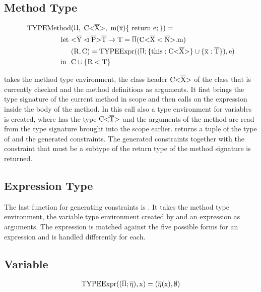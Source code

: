 \subsection{Method Type}

\begin{align*}
    \text{TYPEMethod}&(\sprod{0.7}, \ \text{C<} \ot{X} \text{>}, \ \text{m} ( \ot{x} ) \{ \ \text{return e}; \} ) = \\
    \text{let} \ &\yp \oto{\text{T}} = \sprod{0.7} ( \cm ) \\
    & ( \text{R}, \text{C} ) = \text{TYPEExpr} (( \sprod{0.7}; \{ \text{this} : \text{C<} \ot{X} \text{>} \} \cup \{ \ot{x} : \ot{T} \} ) , \text{e} ) \\
    \text{in} \ \  & \text{C} \cup \{ \text{R} < \text{T} \}\\
\end{align*}

 takes the method type environment, the class header $\text{C<}\overline{\text{X}}\text{>}$ of the class that is currently checked and the method definitions as arguments.
It first brings the type signature of the current method in scope and then calls  on the expression  inside the body of the method. In this call also a type environment for variables is created, where  has the type $\text{C<}\overline{\text{T}}\text{>}$ and the arguments of the method are read from the type signature brought into the scope earlier.
 returns a tuple of the type  of  and the generated constraints. The generated constraints together with the constraint that  must be a subtype of the return type of the method signature is returned.

\subsection{Expression Type}
The last function for generating constraints is . It takes the method type environment, the variable type environment created by  and an expression  as arguments.
The expression  is matched against the five possible forms for an expression and is handled differently for each.

\subsection{Variable}

\begin{align*}
    \texpr{\text{x}} = (\overline{\eta} (\text{x}), \emptyset)\\
\end{align*}

